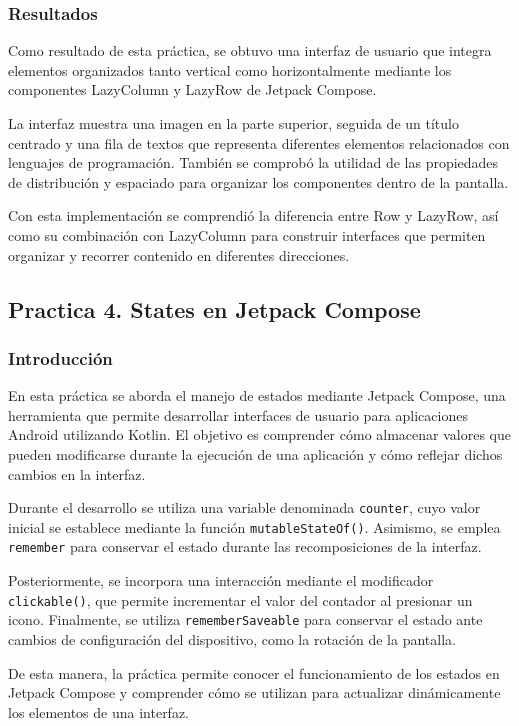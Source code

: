\documentclass[12pt,a4paper]{article}
\begin{document}
\subsubsection{Resultados}
Como resultado de esta práctica, se obtuvo una interfaz de usuario que integra elementos organizados tanto vertical como horizontalmente mediante los componentes LazyColumn y LazyRow de Jetpack Compose.

La interfaz muestra una imagen en la parte superior, seguida de un título centrado y una fila de textos que representa diferentes elementos relacionados con lenguajes de programación. También se comprobó la utilidad de las propiedades de distribución y espaciado para organizar los componentes dentro de la pantalla.

Con esta implementación se comprendió la diferencia entre Row y LazyRow, así como su combinación con LazyColumn para construir interfaces que permiten organizar y recorrer contenido en diferentes direcciones.

\newpage

\subsection{Practica 4. States en Jetpack Compose}

\subsubsection{Introducción}
En esta práctica se aborda el manejo de estados mediante Jetpack Compose, una herramienta que permite desarrollar interfaces de usuario para aplicaciones Android utilizando Kotlin. El objetivo es comprender cómo almacenar valores que pueden modificarse durante la ejecución de una aplicación y cómo reflejar dichos cambios en la interfaz.

Durante el desarrollo se utiliza una variable denominada \texttt{counter}, cuyo valor inicial se establece mediante la función \texttt{mutableStateOf()}. Asimismo, se emplea \texttt{remember} para conservar el estado durante las recomposiciones de la interfaz.

Posteriormente, se incorpora una interacción mediante el modificador \texttt{clickable()}, que permite incrementar el valor del contador al presionar un icono. Finalmente, se utiliza \texttt{rememberSaveable} para conservar el estado ante cambios de configuración del dispositivo, como la rotación de la pantalla.

De esta manera, la práctica permite conocer el funcionamiento de los estados en Jetpack Compose y comprender cómo se utilizan para actualizar dinámicamente los elementos de una interfaz.
\end{document}
